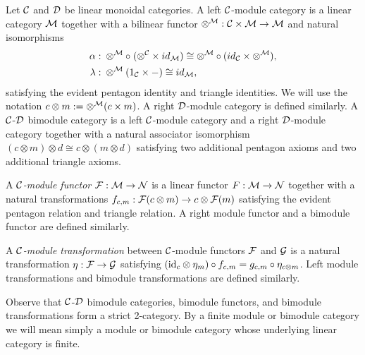 \documentclass{amsart}
\begin{document}
\begin{definition}
Let $\mathcal C$ and $\mathcal D$ be linear monoidal categories.
A left $\mathcal C$-module category is a linear category $\mathcal M$ together with a bilinear functor $\otimes^{\mathcal M}: \mathcal C \times \mathcal M \to \mathcal M$ and natural isomorphisms
	\begin{align*}
		\alpha: & \;    \otimes^{\mathcal M} \circ \; (\otimes^{\mathcal C} \times id_{\mathcal M}) \cong  \otimes^{\mathcal M} \circ (id_{\mathcal C} \times \otimes^{\mathcal M}), \\
		\lambda: & \; \otimes^{\mathcal M} (1_{\mathcal C} \times -) \cong id_{\mathcal M},
	\end{align*}
	satisfying the evident pentagon identity and triangle identities.  We will use the notation $c \otimes m := \otimes^\mathcal M(c \times m)$.  A right $\mathcal D$-module category is defined similarly.
	A $\mathcal C$-$\mathcal D$ bimodule category is a left $\mathcal C$-module category and a right $\mathcal D$-module category together with a natural associator isomorphism $(c \otimes m) \otimes d \cong c \otimes (m \otimes d)$ satisfying two additional pentagon axioms and two additional triangle axioms.
\end{definition}

\begin{definition}		
A {\em $\mathcal C$-module functor} $\mathcal F:\mathcal M \to \mathcal N$ is a linear functor $F:\mathcal M \to \mathcal N$ together with a natural transformations $f_{c,m}:\mathcal F(c \otimes m) \rightarrow c \otimes \mathcal F(m)$ satisfying the evident pentagon relation and triangle relation.  A right module functor and a bimodule functor are defined similarly.
\end{definition}
\begin{definition}
	A {\em $\mathcal C$-module transformation} between $\mathcal C$-module functors $\mathcal F$ and $\mathcal G$ is a natural transformation $\eta: \mathcal F \rightarrow \mathcal G$ satisfying $(\mathrm{id}_c \otimes \eta_m) \circ f_{c,m} = g_{c,m} \circ \eta_{c \otimes m}$.  Left module transformations and bimodule transformations are defined similarly.
\end{definition} %
	
%
\nid Observe that $\mathcal C$-$\mathcal D$ bimodule categories, bimodule functors, and bimodule transformations form a strict 2-category.  By a finite module or bimodule category we will mean simply a module or bimodule category whose underlying linear category is finite.
\end{document}
